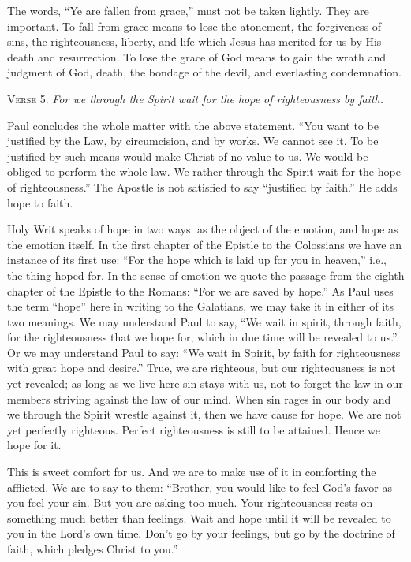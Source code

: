 The words, “Ye are fallen from grace,” must not be taken lightly. They are important. To fall from grace means to lose the atonement, the forgiveness of sins, the righteousness, liberty, and life which Jesus has merited for us by His death and resurrection. To lose the grace of God means to gain the wrath and judgment of God, death, the bondage of the devil, and everlasting condemnation.

\textsc{Verse} 5. \emph{For we through the Spirit wait for the hope of righteousness by faith.}

Paul concludes the whole matter with the above statement. “You want to be justified by the Law, by circumcision, and by works. We cannot see it. To be justified by such means would make Christ of no value to us. We would be obliged to perform the whole law. We rather through the Spirit wait for the hope of righteousness.” The Apostle is not satisfied to say “justified by faith.” He adds hope to faith.

Holy Writ speaks of hope in two ways: as the object of the emotion, and hope as the emotion itself. In the first chapter of the Epistle to the Colossians we have an instance of its first use: “For the hope which is laid up for you in heaven,” i.e., the thing hoped for. In the sense of emotion we quote the passage from the eighth chapter of the Epistle to the Romans: “For we are saved by hope.” As Paul uses the term “hope” here in writing to the Galatians, we may take it in either of its two meanings. We may understand Paul to say, “We wait in spirit, through faith, for the righteousness that we hope for, which in due time will be revealed to us.” Or we may understand Paul to say: “We wait in Spirit, by faith for righteousness with great hope and desire.” True, we are righteous, but our righteousness is not yet revealed; as long as we live here sin stays with us, not to forget the law in our members striving against the law of our mind. When sin rages in our body and we through the Spirit wrestle against it, then we have cause for hope. We are not yet perfectly righteous. Perfect righteousness is still to be attained. Hence we hope for it.

This is sweet comfort for us. And we are to make use of it in comforting the afflicted. We are to say to them: “Brother, you would like to feel God’s favor as you feel your sin. But you are asking too much. Your righteousness rests on something much better than feelings. Wait and hope until it will be revealed to you in the Lord’s own time. Don’t go by your feelings, but go by the doctrine of faith, which pledges Christ to you.”

